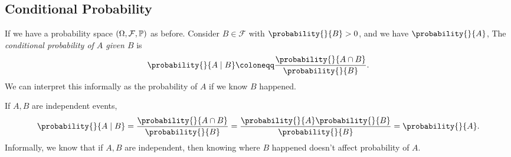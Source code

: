 \subsection{Conditional Probability}
\leavevmode
\begin{definition}
    If we have a probability space \((\Omega, \mathcal{F}, \mathbb{\MakeUppercase{P}})\) as before. Consider \(B \in \mathcal{F} \) with \(\probability{}{B} >0\), and we have \(\probability{}{A} \), The \textit{conditional probability of \(A\) given \(B\)} is
    \[
        \probability{}{A\mid B}\coloneqq \frac{\probability{}{A\cap B} }{\probability{}{B} }.
    \]
    We can interpret this informally as the probability of \(A\) if we know \(B\) happened.
\end{definition}
\begin{example}
    If \(A, B\) are independent events,
    \[
        \probability{}{A\mid B} = \frac{\probability{}{A\cap B}}{\probability{}{B} } = \frac{\probability{}{A} \probability{}{B} }{\probability{}{B} }=\probability{}{A} .
    \]
    Informally, we know that if \(A, B\) are independent, then knowing where \(B\) happened doesn't affect probability of \(A\).
\end{example}